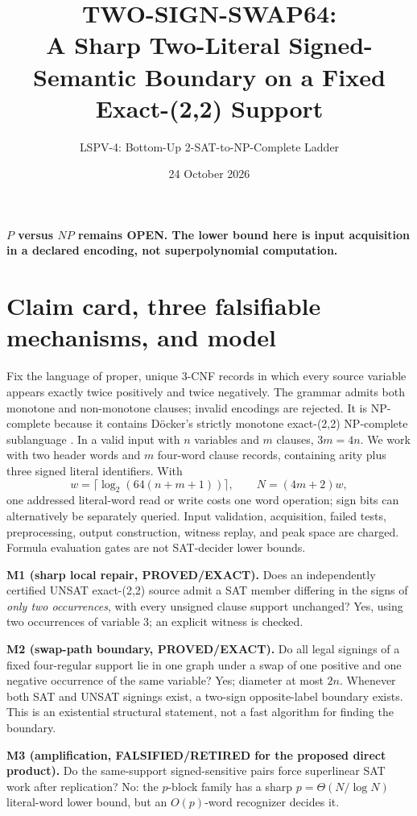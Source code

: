 \documentclass[11pt]{article}
\title{TWO-SIGN-SWAP64:\\A Sharp Two-Literal Signed-Semantic Boundary on a Fixed Exact-(2,2) Support}
\author{LSPV-4: Bottom-Up 2-SAT-to-NP-Complete Ladder}
\date{24 October 2026}
\begin{document}
\maketitle
\begin{center}
\textbf{$P$ versus $NP$ remains OPEN. The lower bound here is input acquisition in a declared encoding, not superpolynomial computation.}
\end{center}

\section{Claim card, three falsifiable mechanisms, and model}
Fix the language of proper, unique 3-CNF records in which every source variable appears exactly twice positively and twice negatively. The grammar admits both monotone and non-monotone clauses; invalid encodings are rejected. It is NP-complete because it contains D\"ocker's strictly monotone exact-(2,2) NP-complete sublanguage \cite{docker}. In a valid input with $n$ variables and $m$ clauses, $3m=4n$.
We work with two header words and $m$ four-word clause records, containing arity plus three signed literal identifiers. With
\[
w=\lceil\log_2(64(n+m+1))\rceil,\qquad N=(4m+2)w,
\]
one addressed literal-word read or write costs one word operation; sign bits can alternatively be separately queried. Input validation, acquisition, failed tests, preprocessing, output construction, witness replay, and peak space are charged. Formula evaluation gates are not SAT-decider lower bounds.

\noindent\textbf{M1 (sharp local repair, PROVED/EXACT).}
Does an independently certified UNSAT exact-(2,2) source admit a SAT member differing in the signs of \emph{only two occurrences}, with every unsigned clause support unchanged? Yes, using two occurrences of variable 3; an explicit witness is checked.

\noindent\textbf{M2 (swap-path boundary, PROVED/EXACT).}
Do all legal signings of a fixed four-regular support lie in one graph under a swap of one positive and one negative occurrence of the same variable? Yes; diameter at most $2n$. Whenever both SAT and UNSAT signings exist, a two-sign opposite-label boundary exists. This is an existential structural statement, not a fast algorithm for finding the boundary.

\noindent\textbf{M3 (amplification, FALSIFIED/RETIRED for the proposed direct product).}
Do the same-support signed-sensitive pairs force superlinear SAT work after replication? No: the $p$-block family has a sharp $p=\Theta(N/\log N)$ literal-word lower bound, but an $O(p)$-word recognizer decides it.
\end{document}
